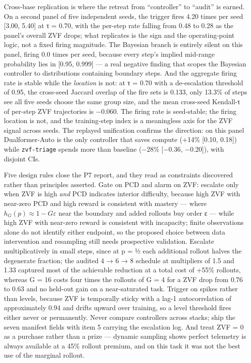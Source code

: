 \documentclass[12pt,a4paper]{report}
\begin{document}
Cross-base replication is where the retreat from ``controller'' to
``audit'' is earned. On a second panel of five independent seeds, the
trigger fires 4.20 times per seed {[}3.00, 5.40{]} at τ = 0.70, with the
per-step rate falling from 0.48 to 0.28 as the panel's overall ZVF
drops; what replicates is the sign and the operating-point logic, not a
fixed firing magnitude. The Bayesian branch is entirely silent on this
panel, firing 0.0 times per seed, because every step's implied mid-range
probability lies in {[}0.95, 0.999{]} --- a real negative finding that
scopes the Bayesian controller to distributions containing boundary
steps. And the aggregate firing rate is stable while the \emph{location}
is not: at τ = 0.70 with a de-escalation threshold of 0.95, the
cross-seed Jaccard overlap of the fire sets is 0.133, only 13.3\% of
steps see all five seeds choose the same group size, and the mean
cross-seed Kendall-τ of per-step ZVF trajectories is −0.060. The firing
rate is seed-stable; the firing location is not, and the training-step
index is a meaningless axis for the ZVF signal across seeds. The
replayed unification confirms the direction: on this panel
Dualformer-Auto is the only controller that saves compute (+14\%
{[}0.10, 0.18{]}) while \texttt{zvf-triage} spends more than baseline
(−28\% {[}−0.36, −0.20{]}), with disjoint CIs.

Five design rules close the P7 report, and they read as constraints
discovered rather than principles asserted. Gate on PCD and alarm on
ZVF: escalate only when ZVF is high \emph{and} PCD indicates interior
difficulty, because high ZVF with near-zero PCD and high reward is
consistent with mastery --- where \(h_G(p) \approx 1 - G\varepsilon\)
near the boundary and added rollouts buy order ε --- while high ZVF with
near-zero reward is consistent with incapacity; finite observations
alone do not identify either endpoint, so the proposed choice between
data intervention and resampling still needs prospective validation.
Escalate multiplicatively in small steps, since at p = ½ each additional
rollout halves the degenerate fraction; the audited 4 → 6 → 8 schedule
at multipliers of 1.5 and 1.33 captured most of the achievable reduction
at a total cost of +55\% rollouts, whereas G = 16 costs four times the
rollouts of G = 4 for a ZVF drop from 0.76 to 0.63 and no held-out gain
on a near-saturated task. Trigger on spikes rather than levels, because
ZVF is temporally sticky with a lag-1 autocorrelation of approximately
0.94 and drifts upward over training, so a level threshold fires either
never or permanently. Never compare controllers across stacks; ship the
seven manifest fields with item 5 carrying the escalation log. And treat
ZVF = 0 as a purchase rather than a prize --- dynamic sampling shows
perfect telemetry is always available at a 45\% rollout premium, and on
this task it was not the best use of the marginal rollout.
\end{document}
